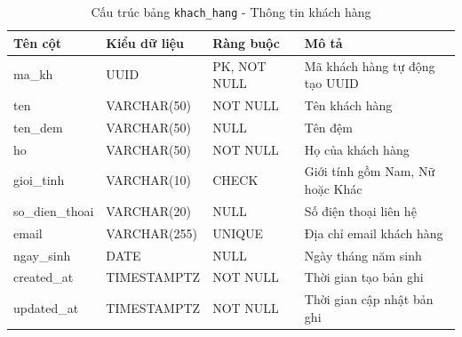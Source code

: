 \begin{table}[H]
  \centering
  \begin{tabularx}{\textwidth}{|l|l|l|>{\raggedright\arraybackslash}X|}
    \hline
    \textbf{Tên cột} & \textbf{Kiểu dữ liệu} & \textbf{Ràng buộc} & \textbf{Mô tả} \\
    \hline
    ma\_kh               & UUID            & PK, NOT NULL    & Mã khách hàng tự động tạo UUID \\ \hline
    ten                  & VARCHAR(50)     & NOT NULL        & Tên khách hàng \\ \hline
    ten\_dem             & VARCHAR(50)     & NULL            & Tên đệm \\ \hline
    ho                   & VARCHAR(50)     & NOT NULL        & Họ của khách hàng \\ \hline
    gioi\_tinh           & VARCHAR(10)     & CHECK           & Giới tính gồm Nam, Nữ hoặc Khác \\ \hline
    so\_dien\_thoai      & VARCHAR(20)     & NULL            & Số điện thoại liên hệ \\ \hline
    email                & VARCHAR(255)    & UNIQUE          & Địa chỉ email khách hàng \\ \hline
    ngay\_sinh           & DATE            & NULL            & Ngày tháng năm sinh \\ \hline
    created\_at          & TIMESTAMPTZ     & NOT NULL        & Thời gian tạo bản ghi \\ \hline
    updated\_at          & TIMESTAMPTZ     & NOT NULL        & Thời gian cập nhật bản ghi \\
    \hline
  \end{tabularx}
  \caption{Cấu trúc bảng \texttt{khach\_hang} - Thông tin khách hàng}
  \label{tab:db-khach-hang}
\end{table}

